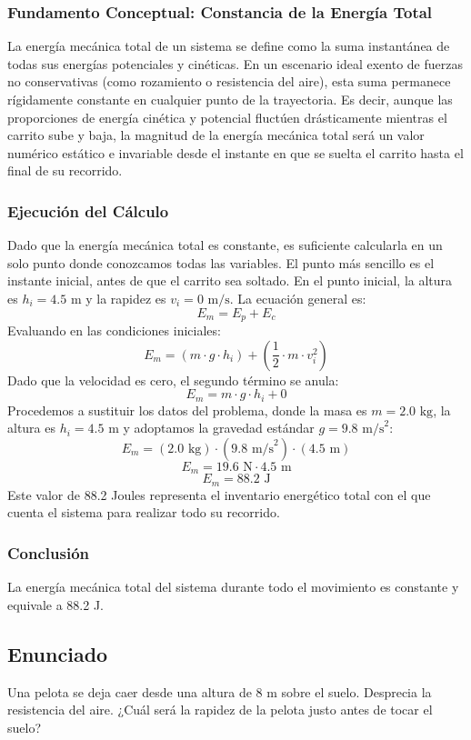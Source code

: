 \documentclass[12pt,a4paper]{article}
\begin{document}
\subsubsection*{Fundamento Conceptual: Constancia de la Energía Total}
La energía mecánica total de un sistema se define como la suma instantánea de todas sus energías potenciales y cinéticas. En un escenario ideal exento de fuerzas no conservativas (como rozamiento o resistencia del aire), esta suma permanece rígidamente constante en cualquier punto de la trayectoria. Es decir, aunque las proporciones de energía cinética y potencial fluctúen drásticamente mientras el carrito sube y baja, la magnitud de la energía mecánica total será un valor numérico estático e invariable desde el instante en que se suelta el carrito hasta el final de su recorrido.

\subsubsection*{Ejecución del Cálculo}
Dado que la energía mecánica total es constante, es suficiente calcularla en un solo punto donde conozcamos todas las variables. El punto más sencillo es el instante inicial, antes de que el carrito sea soltado.
En el punto inicial, la altura es $h_i = 4.5 \text{ m}$ y la rapidez es $v_i = 0 \text{ m/s}$.
La ecuación general es:
$$E_m = E_p + E_c$$
Evaluando en las condiciones iniciales:
$$E_m = (m \cdot g \cdot h_i) + \left(\frac{1}{2} \cdot m \cdot v_i^2\right)$$
Dado que la velocidad es cero, el segundo término se anula:
$$E_m = m \cdot g \cdot h_i + 0$$
Procedemos a sustituir los datos del problema, donde la masa es $m = 2.0 \text{ kg}$, la altura es $h_i = 4.5 \text{ m}$ y adoptamos la gravedad estándar $g = 9.8 \text{ m/s}^2$:
$$E_m = (2.0 \text{ kg}) \cdot (9.8 \text{ m/s}^2) \cdot (4.5 \text{ m})$$
$$E_m = 19.6 \text{ N} \cdot 4.5 \text{ m}$$
$$E_m = 88.2 \text{ J}$$
Este valor de 88.2 Joules representa el inventario energético total con el que cuenta el sistema para realizar todo su recorrido.

\subsubsection*{Conclusión}
La energía mecánica total del sistema durante todo el movimiento es constante y equivale a 88.2 J.

\newpage

\subsection*{Enunciado}
Una pelota se deja caer desde una altura de 8 m sobre el suelo. Desprecia la resistencia del aire. ¿Cuál será la rapidez de la pelota justo antes de tocar el suelo?
\end{document}
